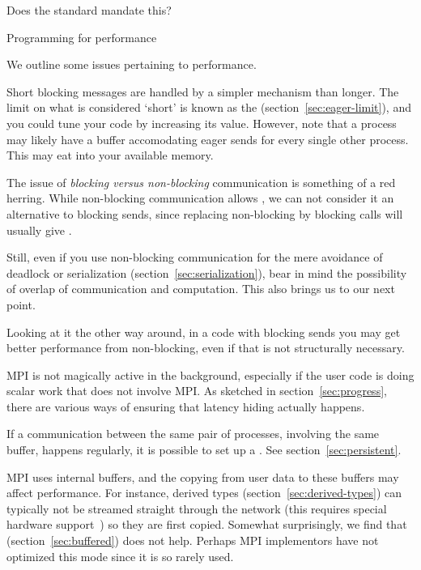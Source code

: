 Does the standard mandate this?

 {Programming for performance}

We outline some issues pertaining to performance.


Short blocking messages are handled by a simpler mechanism than
longer. The limit on what is considered `short' is known as the
 (section~\ref{sec:eager-limit}), and you could
tune your code by increasing its value. However, note that a process
may likely have a buffer accomodating eager sends for every single
other process. This may eat into your available memory.

%
The issue of \emph{blocking versus
  non-blocking}
communication is something of a red herring. While non-blocking
communication allows , we can not
consider it an alternative to blocking sends, since replacing
non-blocking by blocking calls will usually give .

Still, even if you use non-blocking communication for the mere
avoidance of deadlock or serialization
(section~\ref{sec:serialization}), bear in mind the possibility of
overlap of communication and computation. This also brings us to our
next point.

Looking at it the other way around, in a code with blocking sends you
may get better performance from non-blocking, even if that is not
structurally necessary.


MPI is not magically active in the background, especially if the user
code is doing scalar work that does not involve MPI. As sketched in
section~\ref{sec:progress}, there are various ways of ensuring that
latency hiding actually happens.


If a communication between the same pair of processes, involving the
same buffer, happens regularly, it is possible to set up a
. See section~\ref{sec:persistent}.


MPI uses internal buffers, and the copying from user data to these
buffers may affect performance. For instance, derived types
(section~\ref{sec:derived-types}) can typically not be streamed
straight through the network (this requires special hardware
support~\cite{LI:MpiDataUMR}) so they are first copied. Somewhat
surprisingly, we find that 
(section~\ref{sec:buffered}) does not help. Perhaps MPI implementors
have not optimized this mode since it is so rarely used.

